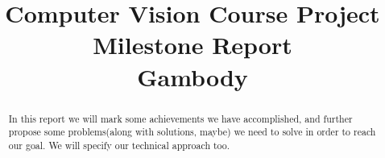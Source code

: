 \documentclass[conference,compsoc]{IEEEtran}
\begin{document}
\title{
	Computer Vision Course Project Milestone Report\\
	Gambody \\
}


\author{
}

\maketitle

\begin{abstract}
	In this report we will mark some achievements we have accomplished, and further propose some problems(along with solutions, maybe) we need to solve in order to reach our goal.
	We will specify our technical approach too.
\end{abstract}
\end{document}

